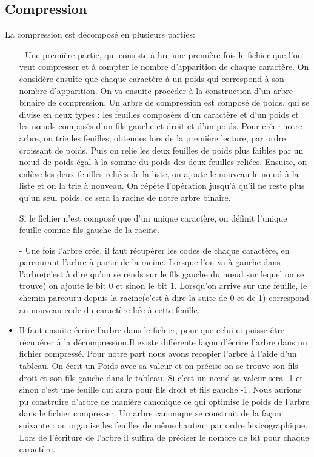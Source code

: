 \documentclass{report}
\begin{document}
\subsection*{Compression}
La compression est décomposé en plusieurs parties:
\begin{itemize}
\item[-] Une première partie, qui consiste à lire une première fois le fichier que l'on veut compresser et à compter le nombre d'apparition de chaque caractère. On considère ensuite que chaque caractère à un poids qui correspond à son nombre d'apparition. On va ensuite procéder à la construction d'un arbre binaire de compression. Un arbre de compression est composé de poids, qui se divise en deux types : les feuilles composées d'un caractère et d'un poids et les  nœuds composés d'un fils gauche et droit et d'un poids. Pour créer notre arbre, on trie les feuilles, obtenues lors de la première lecture, par ordre croissant de poids. Puis on relie les deux feuilles de poids plus faibles par un nœud de poids égal à la somme du poids des deux feuilles reliées.  Ensuite, on enlève les deux feuilles reliées de la liste, on ajoute le nouveau le  nœud à  la liste et on la trie à nouveau. On répète l'opération jusqu'à qu'il ne reste plus qu'un seul poids, ce sera la racine de notre arbre binaire.

Si le fichier n'est composé que d'un unique caractère, on définit l'unique feuille comme fils gauche de la racine.

\item[-]Une fois l'arbre crée, il faut récupérer les codes de chaque caractère, en parcourant l'arbre à partir de la racine. Lorsque l'on va à gauche dans l'arbre(c'est à dire qu'on se rends sur le fils gauche du nœud sur lequel on se trouve) on ajoute le bit 0 et sinon le bit 1. Lorsqu'on arrive sur une feuille, le chemin parcouru depuis la racine(c'est à dire la suite de 0 et de 1) correspond au nouveau code du caractère liée à cette feuille.

\item Il faut ensuite écrire l'arbre dans le fichier, pour que celui-ci puisse être récupérer à la décompression.Il existe différente façon d'écrire l'arbre dans un fichier compressé. Pour notre part nous avons recopier l'arbre à l'aide d'un tableau. On écrit un Poids avec sa valeur et on précise on se trouve son fils droit et son fils gauche dans le tableau. Si c'est un  nœud  sa valeur sera -1 et sinon c'est une feuille qui aura pour fils droit et fils gauche -1.
Nous aurions pu construire d'arbre de manière canonique ce qui optimise le poids de l'arbre dans le fichier compresser. Un arbre canonique se construit de la façon suivante :
on organise les feuilles de même hauteur par ordre lexicographique. Lors de l'écriture de l'arbre il suffira de préciser le nombre de bit pour chaque caractère.


\end{itemize}
\end{document}
